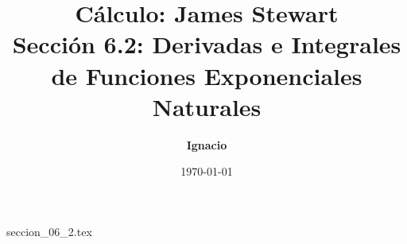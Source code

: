 \documentclass[11pt,spanish,oneside]{report}
\title{\textbf{Cálculo: James Stewart} \\ \Large Sección 6.2: Derivadas e Integrales de Funciones Exponenciales Naturales}
\author{\textbf{Ignacio}}
\date{\today}
\begin{document}
\maketitle

{seccion_06_2.tex}
\end{document}
